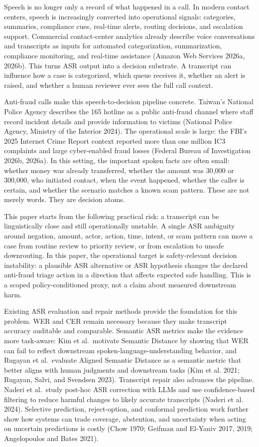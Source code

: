 \documentclass[
]{article}
\begin{document}
Speech is no longer only a record of what happened in a call. In modern
contact centers, speech is increasingly converted into operational
signals: categories, summaries, compliance cues, real-time alerts,
routing decisions, and escalation support. Commercial contact-center
analytics already describe voice conversations and transcripts as inputs
for automated categorization, summarization, compliance monitoring, and
real-time assistance (Amazon Web Services 2026a, 2026b). This turns ASR
output into a decision substrate. A transcript can influence how a case
is categorized, which queue receives it, whether an alert is raised, and
whether a human reviewer ever sees the full call context.

Anti-fraud calls make this speech-to-decision pipeline concrete.
Taiwan's National Police Agency describes the 165 hotline as a public
anti-fraud channel where staff record incident details and provide
information to victims (National Police Agency, Ministry of the Interior
2024). The operational scale is large: the FBI's 2025 Internet Crime
Report context reported more than one million IC3 complaints and large
cyber-enabled fraud losses (Federal Bureau of Investigation 2026b,
2026a). In this setting, the important spoken facts are often small:
whether money was already transferred, whether the amount was 30,000 or
300,000, who initiated contact, when the event happened, whether the
caller is certain, and whether the scenario matches a known scam
pattern. These are not merely words. They are decision atoms.

This paper starts from the following practical risk: a transcript can be
linguistically close and still operationally unstable. A single ASR
ambiguity around negation, amount, actor, action, time, intent, or scam
pattern can move a case from routine review to priority review, or from
escalation to unsafe downrouting. In this paper, the operational target
is safety-relevant decision instability: a plausible ASR alternative or
ASR hypothesis changes the declared anti-fraud triage action in a
direction that affects expected safe handling. This is a scoped
policy-conditioned proxy, not a claim about measured downstream harm.

Existing ASR evaluation and repair methods provide the foundation for
this problem. WER and CER remain necessary because they make transcript
accuracy auditable and comparable. Semantic ASR metrics make the
evidence more task-aware: Kim et al.~motivate Semantic Distance by
showing that WER can fail to reflect downstream
spoken-language-understanding behavior, and Rugayan et al.~evaluate
Aligned Semantic Distance as a semantic metric that better aligns with
human judgments and downstream tasks (Kim et al. 2021; Rugayan, Salvi,
and Svendsen 2023). Transcript repair also advances the pipeline. Naderi
et al.~study post-hoc ASR correction with LLMs and use confidence-based
filtering to reduce harmful changes to likely accurate transcripts
(Naderi et al. 2024). Selective prediction, reject-option, and conformal
prediction work further show how systems can trade coverage, abstention,
and uncertainty when acting on uncertain predictions is costly (Chow
1970; Geifman and El-Yaniv 2017, 2019; Angelopoulos and Bates 2021).
\end{document}
